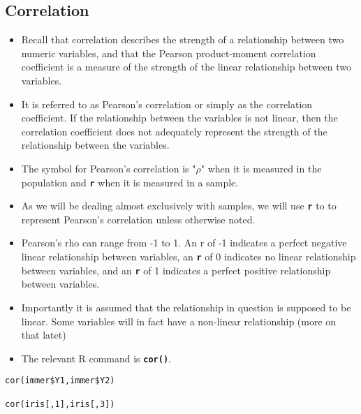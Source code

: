 \documentclass[ModuleBmain.tex]{subfiles}
\begin{document}
\subsection{Correlation}
\begin{itemize}
\item Recall that correlation describes the strength of a relationship between two numeric variables, and that the Pearson product-moment correlation coefficient is a measure of the strength of the linear relationship between two variables.

\item It is referred to as Pearson's correlation or simply as the correlation coefficient. If the relationship between the variables is not linear, then the correlation coefficient does not adequately represent the strength of the relationship between the variables.

\item The symbol for Pearson's correlation is "$\rho$" when it is measured in the population and \texttt{\textbf{r}} when it is measured in a sample.

\item As we will be dealing almost exclusively with samples, we will use \texttt{\textbf{r}} to to represent Pearson's correlation unless otherwise noted.

\item 
Pearson's rho can range from -1 to 1. An r of -1 indicates a perfect negative linear relationship between variables, an \texttt{\textbf{r}} of 0 indicates no linear relationship between variables, and an \texttt{\textbf{r}} of 1 indicates a perfect positive relationship between variables.

\item Importantly it is assumed that the relationship in question is supposed to be linear. Some variables will in fact have a non-linear relationship (more on that latet)
\item 
The relevant R command is \texttt{\textbf{cor()}}.
\end{itemize}

\begin{framed}
\begin{verbatim}
cor(immer$Y1,immer$Y2)

cor(iris[,1],iris[,3])
\end{verbatim}
\end{framed}
\end{document}
